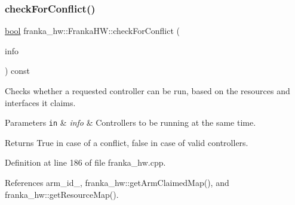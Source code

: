 \subsubsection{\texorpdfstring{check\+For\+Conflict()}{checkForConflict()}}
{\footnotesize\ttfamily \hyperlink{classbool}{bool} franka\+\_\+hw\+::\+Franka\+H\+W\+::check\+For\+Conflict (\begin{DoxyParamCaption}\item[{const std\+::list$<$ hardware\+\_\+interface\+::\+Controller\+Info $>$ \&}]{info }\end{DoxyParamCaption}) const\hspace{0.3cm}{\ttfamily [override]}}

Checks whether a requested controller can be run, based on the resources and interfaces it claims.


\begin{DoxyParams}[1]{Parameters}
\mbox{\tt in}  & {\em info} & Controllers to be running at the same time.\\
\hline
\end{DoxyParams}
\begin{DoxyReturn}{Returns}
True in case of a conflict, false in case of valid controllers. 
\end{DoxyReturn}


Definition at line 186 of file franka\+\_\+hw.\+cpp.



References arm\+\_\+id\+\_\+, franka\+\_\+hw\+::get\+Arm\+Claimed\+Map(), and franka\+\_\+hw\+::get\+Resource\+Map().


